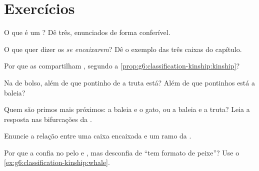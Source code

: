 \section{Exercícios}

\begin{exercise}[$\star$]\label{exo:g6:classification-kinship:1}
O que é um ? Dê três, enunciados de forma conferível.
\end{exercise}

\begin{exercise}[$\star$]\label{exo:g6:classification-kinship:2}
O que quer dizer os  \emph{se encaixarem}? Dê o exemplo das
três caixas do capítulo.
\end{exercise}

\begin{exercise}[$\star$]\label{exo:g6:classification-kinship:3}
Por que as  compartilham , segundo a
\cref{prop:g6:classification-kinship:kinship}?
\end{exercise}

\begin{exercise}[$\star$]\label{exo:g6:classification-kinship:4}
Na  de bolso, além de que pontinho de  a truta está?
Além de que pontinhos está a baleia?
\end{exercise}

\begin{exercise}[$\star$]\label{exo:g6:classification-kinship:5}
Quem são primos mais próximos: a baleia e o gato, ou a baleia e a
truta? Leia a resposta nas bifurcações da .
\end{exercise}

\begin{exercise}[$\star$]\label{exo:g6:classification-kinship:6}
Enuncie a relação entre uma caixa encaixada e um ramo da .
\end{exercise}

\begin{exercise}[$\star\star$]\label{exo:g6:classification-kinship:7}
Por que a  confia no pelo e , mas desconfia de
``tem formato de peixe''? Use o
\cref{ex:g6:classification-kinship:whale}.
\end{exercise}

